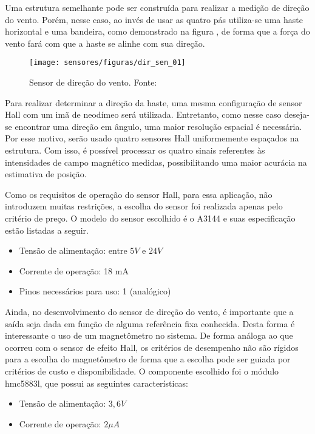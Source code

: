 	Uma estrutura semelhante pode ser construída para realizar a medição de direção do vento. Porém, nesse caso, ao invés de usar as quatro pás utiliza-se uma haste horizontal e uma bandeira, como demonstrado na figura , de forma que a força do vento fará com que a haste se alinhe com sua direção.
	
	\begin{figure}[H]
		\centering
		\texttt{[image: sensores/figuras/dir\_sen\_01]}
		\caption{Sensor de direção do vento. Fonte: \cite{bib_dir_sen_01}}
		\label{vel_sen_01}
	\end{figure}		
	
	Para realizar determinar a direção da haste, uma mesma configuração de sensor Hall com um imã de neodímeo será utilizada. Entretanto, como nesse caso deseja-se encontrar uma direção em ângulo, uma maior resolução espacial é necessária. Por esse motivo, serão usado quatro sensores Hall uniformemente espaçados na estrutura. Com isso, é possível processar os quatro sinais referentes às intensidades de campo magnético medidas, possibilitando uma maior acurácia na estimativa de posição.
	
	Como os requisitos de operação do sensor Hall, para essa aplicação, não introduzem muitas restrições, a escolha do sensor foi realizada apenas pelo critério de preço. O modelo do sensor escolhido é o A3144 e suas especificação estão listadas a seguir. 
	
		\begin{itemize}
				\item Tensão de alimentação: entre $5V$ e $24V$
				\item Corrente de operação: 18 mA
				\item Pinos necessários para uso: 1 (analógico) 
		\end{itemize}

	Ainda, no desenvolvimento do sensor de direção do vento, é importante que a saída seja dada em função de alguma referência fixa conhecida. Desta forma é interessante o uso de um magnetômetro no sistema. De forma análoga ao que ocorreu com o sensor de efeito Hall, os critérios de desempenho não são rígidos para a escolha do magnetômetro de forma que a escolha pode ser guiada por critérios de custo e disponibilidade. O componente escolhido foi o módulo hmc5883l, que possui as seguintes características:
		\begin{itemize}
			\item Tensão de alimentação: $3,6V$
			\item Corrente de operação: $2 \mu A$
		\end{itemize}

